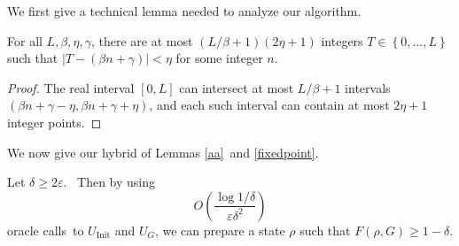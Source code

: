 We first give a technical lemma needed to analyze our algorithm.

\begin{lemma}
\label{interval}For all $L,\beta,\eta,\gamma$, there are at most $\left(
L/\beta+1\right)  \left(  2\eta+1\right)  $ integers $T\in\left\{
0,\ldots,L\right\}$ such that $\left\vert T-\left(  \beta n+\gamma\right)
\right\vert <\eta$ for some integer $n$.
\end{lemma}

\begin{proof}
The real interval $\left[  0,L\right]  $ can intersect at most $L/\beta
+1$ intervals $\left(  \beta n+\gamma-\eta,\beta n+\gamma+\eta\right)  $, and
each such interval can contain at most $2\eta+1$ integer points.
\end{proof}

We now give our hybrid of Lemmas \ref{aa}\ and \ref{fixedpoint}.

\begin{theorem}
\label{combined}Let $\delta\geq2\varepsilon$.
\ Then by using \[
O\left(  \frac{\log1/\delta}{\varepsilon\delta^{2}}\right)
\]
oracle calls\ to $U_{\operatorname*{Init}}$ and $U_{G}$, we can prepare a
state $\rho$ such that $F\left(  \rho,G\right)  \geq1-\delta$.
\end{theorem}

